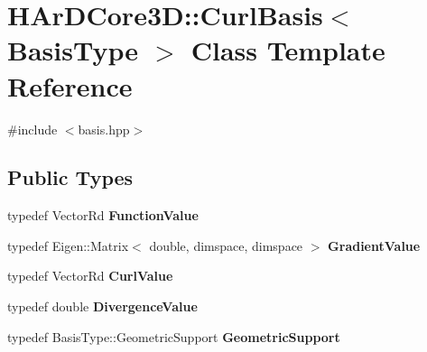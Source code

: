 \hypertarget{classHArDCore3D_1_1CurlBasis}{}\section{H\+Ar\+D\+Core3D\+:\+:Curl\+Basis$<$ Basis\+Type $>$ Class Template Reference}
\label{classHArDCore3D_1_1CurlBasis}


{\ttfamily \#include $<$basis.\+hpp$>$}

\subsection*{Public Types}
\begin{DoxyCompactItemize}
\item 
\mbox{\label{classHArDCore3D_1_1CurlBasis_a7e5eb1482d6efca49471b2800a5efe40}} 
typedef Vector\+Rd {\bfseries Function\+Value}
\item 
\mbox{\label{classHArDCore3D_1_1CurlBasis_a58d6ef3138763855bc986ee8173b0d30}} 
typedef Eigen\+::\+Matrix$<$ double, dimspace, dimspace $>$ {\bfseries Gradient\+Value}
\item 
\mbox{\label{classHArDCore3D_1_1CurlBasis_a533a905a9554da41681e92d56d81d689}} 
typedef Vector\+Rd {\bfseries Curl\+Value}
\item 
\mbox{\label{classHArDCore3D_1_1CurlBasis_a5da003cb660e44eaf9a899631494503f}} 
typedef double {\bfseries Divergence\+Value}
\item 
\mbox{\label{classHArDCore3D_1_1CurlBasis_a351ef62bb74afe2ddeff23d28879634d}} 
typedef Basis\+Type\+::\+Geometric\+Support {\bfseries Geometric\+Support}
\end{DoxyCompactItemize}

